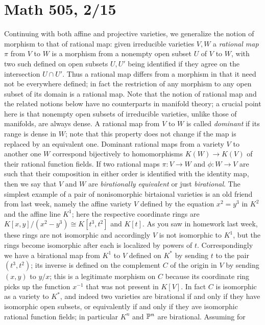 \documentclass[10pt]{article}
\begin{document}
\section*{Math 505, 2/15}

Continuing with both affine and projective varieties, we generalize the
notion of morphism to that of rational map: given irreducible varieties
$V,W$ a {\sl rational map} $\pi$ from $V$ to $W$ is a morphism from a
nonempty open subset $U$ of $V$ to $W$, with two such defined on open
subsets $U,U'$ being identified if they agree on the intersection $U\cap
U'$. Thus a rational map differs from a morphism in that it need not be
everywhere defined; in fact the restriction of any morphism to any open
subset of its domain is a rational map. Note that the notion of rational
map and the related notions below have no counterparts in manifold
theory; a crucial point here is that nonempty open subsets of
irreducible varieties, unlike those of manifolds, are always dense. A
rational map from $V$ to $W$ is called {\sl dominant} if its range is
dense in $W$; note that this property does not change if the map is
replaced by an equivalent one. Dominant rational maps from a variety $V$
to another one $W$ correspond bijectively to homomorphisms
$K(W)\rightarrow K(V)$ of their rational function fields. If two
rational maps $\pi:V\rightarrow W$ and $\phi:W\rightarrow V$ are such
that their composition in either order is identified with the identity
map, then we say that $V$ and $W$ are {\sl birationally equivalent} or
just {\sl birational}. The simplest example of a pair of nonisomorphic
birtaional varieties is an old friend from last week, namely the affine
variety $V$ defined by the equation $x^2 = y^3$ in $K^2$ and the affine
line $K^1$; here the respective coordinate rings are $K[x,y]/(x^2 -
y^3)\cong K[t^3,t^2]$ and $K[t]$. As you saw in homework last week,
these rings are not isomorphic and accordingly $V$ is not isomorphic to
$K^1$, but the rings become isomorphic after each is localized by powers
of $t$. Correspondingly we have a birational map from $K^1$ to $V$
defined on $K^*$ by sending $t$ to the pair $(t^3,t^2)$; its inverse is
defined on the complement $C$ of the origin in $V$ by sending $(x,y)$ to
$y/x$; this is a legitimate morphism on $C$ because its coordinate ring
picks up the function $x^{-1}$ that was not present in $K[V]$. In fact
$C$ is isomorphic as a variety to $K^*$, and indeed two varieties are
birational if and only if they have isomorphic open subsets, or
equivalently if and only if they ave isomorphic rational function
fields; in particular $K^n$ and $\Bbb P^n$ are birational. Assuming for
\end{document}
